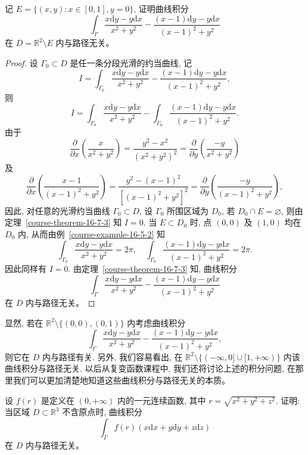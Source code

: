 \documentclass[UTF8,12pt,a4paper,fontset=fandol]{ctexart}
\begin{document}
\begin{example}\label{course-example-16-7-1}\quad 记 $E=\{(x,y):x\in[0,1],y=0\}$, 证明曲线积分
\[
  \int_\Gamma\frac{x\mathrm dy-y\mathrm dx}{x^2+y^2}
  -\frac{(x-1)\mathrm dy-y\mathrm dx}{(x-1)^2+y^2}
\]
在 $D=\mathbb R^2\setminus E$ 内与路径无关。

\end{example}
\begin{proof}\quad 设 $\Gamma_0\subset D$ 是任一条分段光滑的约当曲线, 记
\[
  I=\int_{\Gamma_0}\frac{x\mathrm dy-y\mathrm dx}{x^2+y^2}
  -\frac{(x-1)\mathrm dy-y\mathrm dx}{(x-1)^2+y^2},
\]
则
\[
  I=\int_{\Gamma_0}\frac{x\mathrm dy-y\mathrm dx}{x^2+y^2}
  -\int_{\Gamma_0}\frac{(x-1)\mathrm dy-y\mathrm dx}{(x-1)^2+y^2}.
\]
由于
\[
  \frac{\partial}{\partial x}\left(\frac{x}{x^2+y^2}\right)
  =\frac{y^2-x^2}{(x^2+y^2)^2}
  =\frac{\partial}{\partial y}\left(\frac{-y}{x^2+y^2}\right)
\]
及
\[
  \frac{\partial}{\partial x}\left(\frac{x-1}{(x-1)^2+y^2}\right)
  =\frac{y^2-(x-1)^2}{[(x-1)^2+y^2]^2}
  =\frac{\partial}{\partial y}\left(\frac{-y}{(x-1)^2+y^2}\right),
\]
因此, 对任意的光滑约当曲线 $\Gamma_0\subset D$, 设 $\Gamma_0$ 所围区域为 $D_0$, 若 $D_0\cap E=\varnothing$, 则由定理~\ref{course-theorem-16-7-3}  知 $I=0$. 当 $E\subset D_0$ 时, 点 $(0,0)$ 及 $(1,0)$ 均在 $D_0$ 内, 从而由例~\ref{course-example-16-5-2}  知
\[
  \int_{\Gamma_0}\frac{x\mathrm dy-y\mathrm dx}{x^2+y^2}=2\pi,
  \quad
  \int_{\Gamma_0}\frac{(x-1)\mathrm dy-y\mathrm dx}{(x-1)^2+y^2}=2\pi.
\]
因此同样有 $I=0$. 由定理~\ref{course-theorem-16-7-3}  知, 曲线积分
\[
  \int_\Gamma\frac{x\mathrm dy-y\mathrm dx}{x^2+y^2}
  -\frac{(x-1)\mathrm dy-y\mathrm dx}{(x-1)^2+y^2}
\]
在 $D$ 内与路径无关。

\end{proof}
\begin{remark}\quad 显然, 若在 $\mathbb R^2\setminus\{(0,0),(0,1)\}$ 内考虑曲线积分
\[
  \int_\Gamma\frac{x\mathrm dy-y\mathrm dx}{x^2+y^2}
  -\frac{(x-1)\mathrm dy-y\mathrm dx}{(x-1)^2+y^2},
\]
则它在 $D$ 内与路径有关. 另外, 我们容易看出, 在 $\mathbb R^2\setminus\{(-\infty,0]\cup[1,+\infty)\}$ 内该曲线积分与路径无关. 以后从复变函数课程中, 我们还将讨论上述的积分问题, 在那里我们可以更加清楚地知道这些曲线积分与路径无关的本质。

\end{remark}
\begin{example}\label{course-example-16-7-2}\quad 设 $f(r)$ 是定义在 $(0,+\infty)$ 内的一元连续函数, 其中 $r=\sqrt{x^2+y^2+z^2}$. 证明: 当区域 $D\subset\mathbb R^3$ 不含原点时, 曲线积分
\[
  \int_\Gamma f(r)(x\mathrm dx+y\mathrm dy+z\mathrm dz)
\]
在 $D$ 内与路径无关。

\end{example}
\end{document}
